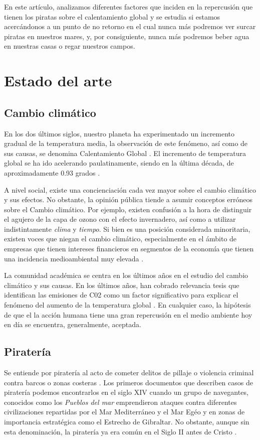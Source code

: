 \documentclass{article}
\begin{document}
En este artículo, analizamos diferentes factores que inciden en la repercusión que tienen los piratas sobre el calentamiento global y se estudia si estamos acercándonos a un punto de no retorno en el cual nunca más podremos ver surcar piratas en nuestros mares, y, por consiguiente, nunca más podremos beber agua en nuestras casas o regar nuestros campos.


\section{Estado del arte}
\subsection{Cambio climático}

En los dos últimos siglos, nuestro planeta ha experimentado un incremento gradual de la temperatura media, la observación de este fenómeno, así como de sus causas, se denomina Calentamiento Global  \cite{mann_selin_2019, rahayuglobal}. El incremento de temperatura global se ha ido acelerando paulatinamente, siendo en la última década, de aproximadamente 0.93 grados \cite{alen}. 

A nivel social, existe una concienciación cada vez mayor sobre el cambio climático y sus efectos. No obstante, la opinión pública tiende a asumir conceptos erróneos sobre el Cambio climático. Por ejemplo, existen confusión a la hora de distinguir el agujero de la capa de ozono con el efecto invernadero, así como a utilizar indistintamente \emph{clima} y \emph{tiempo}\cite{bostrom}. Si bien es una posición considerada minoritaria, existen voces que niegan el cambio climático, especialmente en el ámbito de empresas que tienen intereses financieros en segmentos de la economía que tienen una incidencia medioambiental muy elevada \cite{astroturf}.

La comunidad académica se centra en los últimos años en el estudio del cambio climático y sus causas. En los últimos años, han cobrado relevancia tesis que identifican las emisiones de C02 como un factor significativo para explicar el fenómeno del aumento de la temperatura global \cite{whitmarsh2011}. En cualquier caso, la hipótesis de que el la acción humana tiene una gran repercusión en el medio ambiente hoy en día se encuentra, generalmente, aceptada.

\subsection{Piratería}
Se entiende por piratería al acto de cometer delitos de pillaje o violencia criminal contra barcos o zonas costeras \cite{pennell_2001}. Los primeros documentos que describen casos de piratería podemos encontrarlos en el siglo XIV cuando un grupo de navegantes, conocidos como los \emph{Pueblos del mar} emprendieron ataques contra diferentes civilizaciones repartidas por el Mar Mediterráneo y el Mar Egéo y en zonas de importancia estratégica como el Estrecho de Gibraltar. No obstante, aunque sin esta denominación, la piratería ya era común en el Siglo II antes de Cristo \cite{lane2015}.
\end{document}
